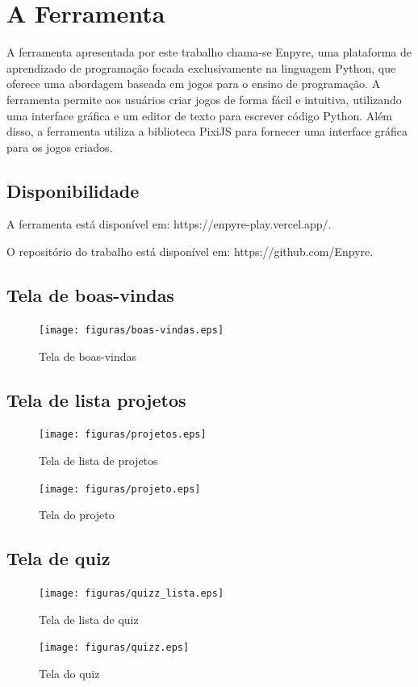 \section{A Ferramenta}

A ferramenta apresentada por este trabalho chama-se Enpyre, uma plataforma de aprendizado de programação focada exclusivamente na linguagem Python, que oferece uma abordagem baseada em jogos para o ensino de programação. A ferramenta permite aos usuários criar jogos de forma fácil e intuitiva, utilizando uma interface gráfica e um editor de texto para escrever código Python. Além disso, a ferramenta utiliza a biblioteca PixiJS para fornecer uma interface gráfica para os jogos criados.

\subsection{Disponibilidade}

A ferramenta está disponível em: https://enpyre-play.vercel.app/.

O repositório do trabalho está disponível em: https://github.com/Enpyre.

\subsection{Tela de boas-vindas}

\begin{figure}[H]
    \centering
    \texttt{[image: figuras/boas-vindas.eps]}
    \caption{Tela de boas-vindas}
    \label{fig:boas-vindas}
\end{figure}

\subsection{Tela de lista projetos}

\begin{figure}[H]
    \centering
    \texttt{[image: figuras/projetos.eps]}
    \caption{Tela de lista de projetos}
    \label{fig:lista-projetos}
\end{figure}

\begin{figure}[H]
    \centering
    \texttt{[image: figuras/projeto.eps]}
    \caption{Tela do projeto}
    \label{fig:projeto}
\end{figure}

\subsection{Tela de quiz}

\begin{figure}[H]
    \centering
    \texttt{[image: figuras/quizz\_lista.eps]}
    \caption{Tela de lista de quiz}
    \label{fig:quiz}
\end{figure}

\begin{figure}[H]
    \centering
    \texttt{[image: figuras/quizz.eps]}
    \caption{Tela do quiz}
    \label{fig:quiz}
\end{figure}
